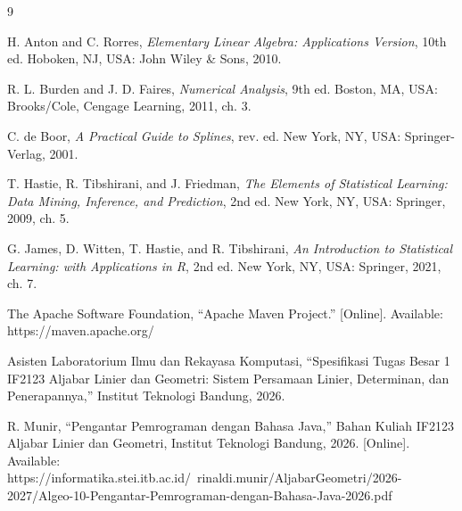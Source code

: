 \clearpage
\begin{thebibliography}{9}

H. Anton and C. Rorres, \textit{Elementary Linear Algebra: Applications Version}, 10th ed. Hoboken, NJ, USA: John Wiley \& Sons, 2010.

R. L. Burden and J. D. Faires, \textit{Numerical Analysis}, 9th ed. Boston, MA, USA: Brooks/Cole, Cengage Learning, 2011, ch. 3.

C. de Boor, \textit{A Practical Guide to Splines}, rev. ed. New York, NY, USA: Springer-Verlag, 2001.

T. Hastie, R. Tibshirani, and J. Friedman, \textit{The Elements of Statistical Learning: Data Mining, Inference, and Prediction}, 2nd ed. New York, NY, USA: Springer, 2009, ch. 5.

G. James, D. Witten, T. Hastie, and R. Tibshirani, \textit{An Introduction to Statistical Learning: with Applications in R}, 2nd ed. New York, NY, USA: Springer, 2021, ch. 7.

The Apache Software Foundation, ``Apache Maven Project.'' [Online]. Available: https://maven.apache.org/

Asisten Laboratorium Ilmu dan Rekayasa Komputasi, ``Spesifikasi Tugas Besar 1 IF2123 Aljabar Linier dan Geometri: Sistem Persamaan Linier, Determinan, dan Penerapannya,'' Institut Teknologi Bandung, 2026.

R. Munir, ``Pengantar Pemrograman dengan Bahasa Java,'' Bahan Kuliah IF2123 Aljabar Linier dan Geometri, Institut Teknologi Bandung, 2026. [Online]. Available: https://informatika.stei.itb.ac.id/~rinaldi.munir/AljabarGeometri/2026-2027/Algeo-10-Pengantar-Pemrograman-dengan-Bahasa-Java-2026.pdf

\end{thebibliography}
